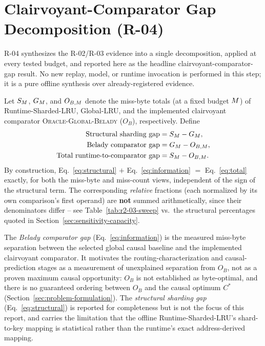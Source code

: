 \section{Clairvoyant-Comparator Gap Decomposition (R-04)}
\label{sec:recoverable-envelope}

R-04 synthesizes the R-02/R-03 evidence into a single decomposition,
applied at every tested budget, and reported here as the headline
clairvoyant-comparator-gap result. No new replay, model, or runtime invocation is performed in this
step; it is a pure offline synthesis over already-registered evidence.

\begin{definition}
\label{def:decomposition}
Let $S_M$, $G_M$, and $O_{B,M}$ denote the miss-byte
totals (at a fixed budget $M$) of Runtime-Sharded-LRU, Global-LRU,
and the implemented clairvoyant comparator \textsc{Oracle-Global-Belady}
($O_B$), respectively. Define
\begin{align}
\text{Structural sharding gap} &= S_M - G_M, \label{eq:structural} \\
\text{Belady comparator gap} &= G_M - O_{B,M}, \label{eq:information} \\
\text{Total runtime-to-comparator gap} &= S_M - O_{B,M}. \label{eq:total}
\end{align}
By construction, Eq.~\eqref{eq:structural} $+$ Eq.~\eqref{eq:information}
$=$ Eq.~\eqref{eq:total} exactly, for both the miss-byte and miss-count
views, independent of the sign of the structural term. The corresponding
\emph{relative} fractions (each normalized by its own comparison's first
operand) are \textbf{not} summed arithmetically, since their denominators
differ -- see Table~\ref{tab:r2-03-sweep} vs.\ the structural
percentages quoted in Section~\ref{sec:sensitivity-capacity}.
\end{definition}

The \emph{Belady comparator gap} (Eq.~\ref{eq:information}) is the measured
miss-byte separation between the selected global causal baseline and the
implemented clairvoyant comparator. It motivates the routing-characterization
and causal-prediction stages as a measurement
of unexplained separation from $O_B$, not as a proven maximum causal
opportunity: $O_B$ is not established as byte-optimal, and there is no
guaranteed ordering between $O_B$ and the causal optimum $C^*$
(Section~\ref{sec:problem-formulation}). The \emph{structural sharding
gap} (Eq.~\ref{eq:structural}) is reported for completeness but is not the
focus of this report, and carries the limitation that the offline
Runtime-Sharded-LRU's shard-to-key mapping is statistical rather than the
runtime's exact address-derived mapping.


